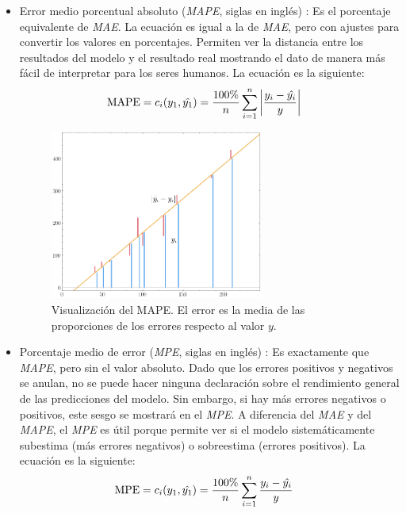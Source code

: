 \begin{itemize}
\item Error medio porcentual absoluto (\textit{MAPE}, siglas en inglés)\cite{errors_basics} \label{MAPE_loss}: Es el porcentaje equivalente de \textit{MAE}. La ecuación es igual a la de \textit{MAE}, pero con ajustes para convertir los valores en porcentajes. Permiten ver la distancia entre los resultados del modelo y el resultado real mostrando el dato de manera más fácil de interpretar para los seres humanos. La ecuación es la siguiente:
\begin{equation}
\centering
    \begin{split}
        \text{MAPE} = c_i(y_1, \hat{y_1}) &= \frac{100\%}{n} \sum_{i=1}^n \left|\frac{y_i-\hat{y_i}}{y}\right|
    \end{split}
\end{equation}

\begin{figure}[H]
    \centering
    \includegraphics[width=7cm]{images/state-of-art/cost-function/mape.png}
    \caption{Visualización del MAPE. El error es la media de las proporciones de los errores respecto al valor $y$.}
    \label{fig:error_mae}
\end{figure}

\item Porcentaje medio de error (\textit{MPE}, siglas en inglés)\cite{errors_basics} \label{MPE_loss}: Es exactamente que \textit{MAPE}, pero sin el valor absoluto. Dado que los errores positivos y negativos se anulan, no se puede hacer ninguna declaración sobre el rendimiento general de las predicciones del modelo. Sin embargo, si hay más errores negativos o positivos, este sesgo se mostrará en el \textit{MPE}. A diferencia del \textit{MAE} y del \textit{MAPE}, el \textit{MPE} es útil porque permite ver si el modelo sistemáticamente subestima (más errores negativos) o sobreestima (errores positivos). La ecuación es la siguiente:
\begin{equation}
\centering
    \begin{split}
        \text{MPE} = c_i(y_1, \hat{y_1}) &= \frac{100\%}{n} \sum_{i=1}^n \frac{y_i-\hat{y_i}}{y}
    \end{split}
\end{equation}


\end{itemize}
